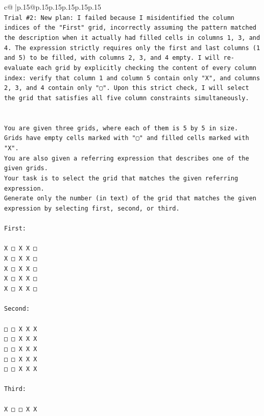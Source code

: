 \documentclass{article}
\begin{document}
{\begin{supertabular}{c@{$\;$}|p{.15\linewidth}@{}p{.15\linewidth}p{.15\linewidth}p{.15\linewidth}p{.15\linewidth}p{.15\linewidth}}
{{{\\ 
\texttt{Trial \#2: New plan: I failed because I misidentified the column indices of the "First" grid, incorrectly assuming the pattern matched the description when it actually had filled cells in columns 1, 3, and 4. The expression strictly requires only the first and last columns (1 and 5) to be filled, with columns 2, 3, and 4 empty. I will re{-}evaluate each grid by explicitly checking the content of every column index: verify that column 1 and column 5 contain only "X", and columns 2, 3, and 4 contain only "▢". Upon this strict check, I will select the grid that satisfies all five column constraints simultaneously.} \\
\\ 
\\ 
\texttt{You are given three grids, where each of them is 5 by 5 in size.} \\
\texttt{Grids have empty cells marked with "▢" and filled cells marked with "X".} \\
\texttt{You are also given a referring expression that describes one of the given grids.} \\
\texttt{Your task is to select the grid that matches the given referring expression.} \\
\texttt{Generate only the number (in text) of the grid that matches the given expression by selecting first, second, or third.} \\
\\ 
\texttt{First:} \\
\\ 
\texttt{X □ X X □} \\
\texttt{X □ X X □} \\
\texttt{X □ X X □} \\
\texttt{X □ X X □} \\
\texttt{X □ X X □} \\
\\ 
\texttt{Second:} \\
\\ 
\texttt{□ □ X X X} \\
\texttt{□ □ X X X} \\
\texttt{□ □ X X X} \\
\texttt{□ □ X X X} \\
\texttt{□ □ X X X} \\
\\ 
\texttt{Third:} \\
\\ 
\texttt{X □ □ X X} \\
}}}
\end{supertabular}}
\end{document}
